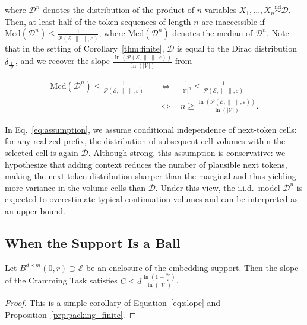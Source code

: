 where $\mathcal D^n$ denotes the distribution of the product of $n$ variables $X_1,...,X_n\overset{\text{iid}}{\sim}\mathcal D$. Then, at least half of the token sequences of length $n$ are inaccessible if $\mathrm{Med}(\mathcal D^n)\leq\frac{1}{\mathcal{P}(\mathcal E,\|\cdot\|,\varepsilon)}$, where $\mathrm{Med}(\mathcal D^n)$ denotes the median of $\mathcal D^n$. Note that in the setting of Corollary~\ref{thm:finite}, $\mathcal D$ is equal to the Dirac distribution $\delta_{\frac{1}{|\mathcal V|}}$, and we recover the slope $\frac{\ln(\mathcal{P}(\mathcal E,\|\cdot\|,\varepsilon))}{\ln(|\mathcal V|)}$ from 

\begin{align}\label{eq:slope}
    \mathrm{Med}(\mathcal D^n)\leq\frac{1}{\mathcal{P}(\mathcal E,\|\cdot\|,\varepsilon)}\quad&\iff\quad\frac1{|\mathcal V|^n}\leq\frac{1}{\mathcal{P}(\mathcal E,\|\cdot\|,\varepsilon)}\nonumber\\
    &\iff\quad n\geq\frac{\ln(\mathcal{P}(\mathcal E,\|\cdot\|,\varepsilon))}{\ln(|\mathcal V|)}.
\end{align}

\begin{remark}
    In Eq.~\ref{eq:assumption}, we assume conditional independence of next-token cells: for any realized prefix, the distribution of subsequent cell volumes within the selected cell is again $\mathcal{D}$. 
    Although strong, this assumption is conservative: we hypothesize that adding context reduces the number of plausible next tokens, making the next-token distribution sharper than the marginal and thus yielding more variance in the volume cells than $\mathcal{D}$.
    Under this view, the i.i.d.\ model $\mathcal{D}^n$ is expected to overestimate typical continuation volumes and can be interpreted as an upper bound.
\end{remark}

\subsection{When the Support Is a Ball}

\begin{proposition}
    Let $B^{d\times m}(0,r)\supset\mathcal E$ be an enclosure of the embedding support. Then the slope of the Cramming Task satisfies $C\leq d\frac{\operatorname{ln}(1+\frac {2r}{\varepsilon})}{\operatorname{ln}(|\mathcal V|)}$.
\end{proposition}

\begin{proof}
    This is a simple corollary of Equation~\ref{eq:slope} and Proposition~\ref{prp:packing_finite}.
\end{proof}

